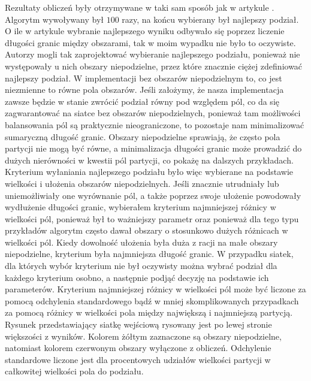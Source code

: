 Rezultaty obliczeń były otrzymywane w taki sam sposób jak w artykule \cite{1364754}.
Algorytm wywoływany był $100$ razy, na końcu wybierany był najlepszy podział.
O ile w artykule \cite{1364754} wybranie najlepszego wyniku odbywało się poprzez liczenie długości granic między obszarami,
tak w moim wypadku nie było to oczywiste.
Autorzy \cite{1364754} mogli tak zaprojektować wybieranie najlepszego podziału, ponieważ nie występowały u nich
obszary niepodzielne, przez które znacznie ciężej zdefiniować najlepszy podział.
W implementacji bez obszarów niepodzielnym to, co jest niezmienne to równe pola obszarów.
Jeśli założymy, że nasza implementacja zawsze będzie w stanie zwrócić podział równy pod względem pól,
co da się zagwarantować na siatce bez obszarów niepodzielnych, ponieważ tam możliwości balansowania
pól są praktycznie nieograniczone, to pozostaje nam minimalizować sumaryczną długość granic.
Obszary niepodzielne sprawiają, że często pola partycji nie mogą być równe, a minimalizacja długości granic może
prowadzić do dużych nierówności w kwestii pól partycji, co pokażę na dalszych przykładach.
Kryterium wyłaniania najlepszego podziału było więc wybierane na podstawie wielkości i ułożenia obszarów niepodzielnych.
Jeśli znacznie utrudniały lub uniemożliwiały one wyrównanie pól, a także poprzez swoje ułożenie powodowały wydłużenie długości granic,
wybierałem kryterium najmniejszej różnicy w wielkości pól, ponieważ był to ważniejszy parametr oraz
ponieważ dla tego typu przykładów algorytm często dawał obszary o stosunkowo dużych różnicach w wielkości pól.
Kiedy dowolność ułożenia była duża z racji na małe obszary niepodzielne, kryterium była najmniejsza długość granic.
W przypadku siatek, dla których wybór kryterium nie był oczywisty można wybrać podział dla każdego kryterium osobno,
a następnie podjąć decyzję na podstawie ich parameterów.
Kryterium najmniejszej różnicy w wielkości pól może być liczone za pomocą odchylenia standardowego bądź w mniej
skomplikowanych przypadkach
za pomocą różnicy w wielkości pola między największą i najmniejszą partycją.
Rysunek przedstawiający siatkę wejściową rysowany jest po lewej stronie większości z wyników.
Kolorem żółtym zaznaczone są obszary niepodzielne, natomiast kolorem czerwonym obszary wyłączone z obliczeń.
Odchylenie standardowe liczone jest dla procentowych udziałów wielkości partycji w całkowitej wielkości pola do podziału.